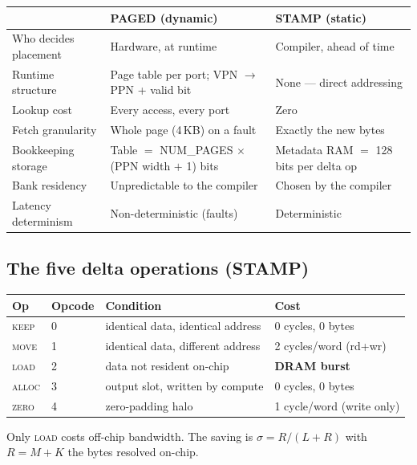 \documentclass[11pt,a4paper]{article}
\newcommand{\op}[1]{\textsc{#1}}
\begin{document}
\begin{center}
\small
\begin{tabular}{@{}p{3.5cm}p{5.8cm}p{5.9cm}@{}}
\toprule
 & \textbf{PAGED (dynamic)} & \textbf{STAMP (static)} \\
\midrule
Who decides placement & Hardware, at runtime & Compiler, ahead of time \\
Runtime structure & Page table per port; VPN $\to$ PPN + valid bit & None --- direct addressing \\
Lookup cost & Every access, every port & Zero \\
Fetch granularity & Whole page (4\,KB) on a fault & Exactly the new bytes \\
Bookkeeping storage & Table $=$ NUM\_PAGES $\times$ (PPN width $+$ 1) bits & Metadata RAM $=$ 128 bits per delta op \\
Bank residency & Unpredictable to the compiler & Chosen by the compiler \\
Latency determinism & Non-deterministic (faults) & Deterministic \\
\bottomrule
\end{tabular}
\end{center}

\subsection{The five delta operations (STAMP)}

\begin{center}
\small
\begin{tabular}{@{}llll@{}}
\toprule
\textbf{Op} & \textbf{Opcode} & \textbf{Condition} & \textbf{Cost} \\
\midrule
\op{keep}  & 0 & identical data, identical address & 0 cycles, 0 bytes \\
\op{move}  & 1 & identical data, different address & 2 cycles/word (rd+wr) \\
\op{load}  & 2 & data not resident on-chip & \textbf{DRAM burst} \\
\op{alloc} & 3 & output slot, written by compute & 0 cycles, 0 bytes \\
\op{zero}  & 4 & zero-padding halo & 1 cycle/word (write only) \\
\bottomrule
\end{tabular}
\end{center}

\noindent Only \op{load} costs off-chip bandwidth. The saving is
$\sigma = R/(L+R)$ with $R = M+K$ the bytes resolved on-chip.
\end{document}
